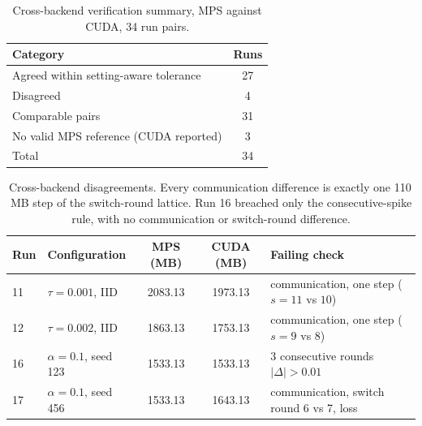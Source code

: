 \begin{table}[H]
\caption{Cross-backend verification summary, MPS against CUDA, 34 run pairs.}
\label{tab:n3a}
\begin{center}
\small
\setlength{\tabcolsep}{4pt}
\begin{tabular}{lc}
\toprule
Category & Runs \\
\midrule
Agreed within setting-aware tolerance & 27 \\
Disagreed & \phantom{0}4 \\
\midrule
Comparable pairs & 31 \\
No valid MPS reference (CUDA reported) & \phantom{0}3 \\
\midrule
Total & 34 \\
\bottomrule
\end{tabular}
\end{center}
\end{table}

\begin{table}[H]
\caption{Cross-backend disagreements. Every communication difference is exactly one 110\,MB step of the switch-round lattice. Run 16 breached only the consecutive-spike rule, with no communication or switch-round difference.}
\label{tab:n3b}
\begin{center}
\footnotesize
\setlength{\tabcolsep}{3pt}
\begin{tabular}{llccl}
\toprule
Run & Configuration & MPS (MB) & CUDA (MB) & Failing check \\
\midrule
11 & $\tau{=}0.001$, IID & 2083.13 & 1973.13 & communication, one step ($s{=}11$ vs $10$) \\
12 & $\tau{=}0.002$, IID & 1863.13 & 1753.13 & communication, one step ($s{=}9$ vs $8$) \\
16 & $\alpha{=}0.1$, seed 123 & 1533.13 & 1533.13 & 3 consecutive rounds $|\Delta|>0.01$ \\
17 & $\alpha{=}0.1$, seed 456 & 1533.13 & 1643.13 & communication, switch round 6 vs 7, loss \\
\bottomrule
\end{tabular}
\end{center}
\end{table}
